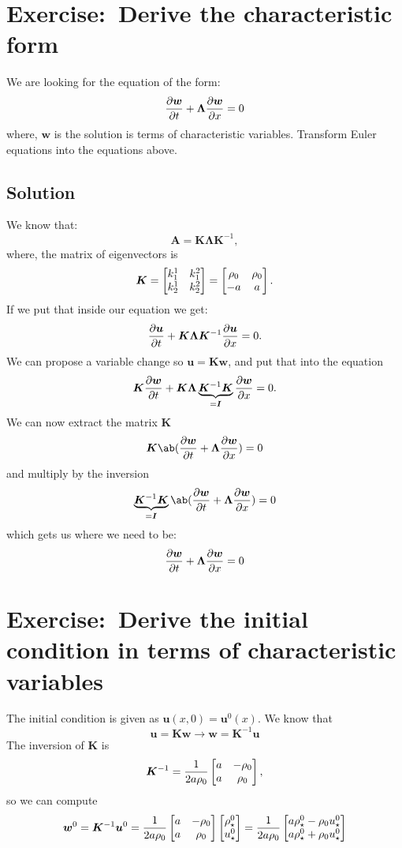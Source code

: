 \documentclass[justified, nobib,a4paper]{tufte-handout}
\newcommand{\Q}[1]{\section{Exercise:~{#1}}}
\newcommand{\Sol}{\subsection{Solution}}
\begin{document}
\Q{Derive the characteristic form}
We are looking for the equation of the form:
\[
	\pdv{\bm{w}}{t} + \bm{\Lambda}\pdv{\bm{w}}{x} = 0
\]
where, $\bm{w}$ is the solution is terms of characteristic variables. Transform Euler equations into the equations above.
\Sol
We know that:
\[
	\bm{A} = \bm{K}\bm{\Lambda}\bm{K}^{-1},
\]
where, the matrix of eigenvectors is
\[
	\bm{K} = \begin{bmatrix}
		k^1_1 & k^2_1 \\
		k^1_2 & k^2_2
	\end{bmatrix} = \begin{bmatrix}
		\rho_0 & \rho_0 \\
		-a  & a
	\end{bmatrix}.
\]
If we put that inside our equation we get:
\[
	\pdv{\bm{u}}{t} + \bm{K}\bm{\Lambda}\bm{K}^{-1}\pdv{\bm{u}}{x} = 0.
\]
We can propose a variable change so $\bm{u} = \bm{K}\bm{w}$, and put that into the
equation
\[
	\bm{K}\pdv{\bm{w}}{t} + \bm{K}\bm{\Lambda}\underbrace{\bm{K}^{-1}\bm{K}}_{=\bm{I}}\pdv{\bm{w}}{x} = 0.
\]
We can now extract the matrix $\bm{K}$
\[
	\bm{K}\ab(\pdv{\bm{w}}{t} + \bm{\Lambda}\pdv{\bm{w}}{x}) = 0
\]
and multiply by the inversion
\[
	\underbrace{\bm{K}^{-1}\bm{K}}_{=\bm{I}}\ab(\pdv{\bm{w}}{t} + \bm{\Lambda}\pdv{\bm{w}}{x}) = 0
\]
which gets us where we need to be:
\[
	\pdv{\bm{w}}{t} + \bm{\Lambda}\pdv{\bm{w}}{x} = 0
\]


\Q{Derive the initial condition in terms of characteristic variables}
The initial condition is given as $\bm{u}(x,0) = \bm{u}^0(x)$. We know that
\[
	\bm{u} = \bm{K}\bm{w} \rightarrow \bm{w} = \bm{K}^{-1}\bm{u}
\]
The inversion of $\bm{K}$ is
\[
	\bm{K}^{-1} = \frac{1}{2a\rho_0} \begin{bmatrix}
		a & -\rho_0 \\
		a & \rho_0
	\end{bmatrix},
\]
so we can compute
\[
	\bm{w}^0 = \bm{K}^{-1}\bm{u}^0 = \frac{1}{2a\rho_0} \begin{bmatrix}
		a & -\rho_0 \\
		a & \rho_0
	\end{bmatrix}
	\begin{bmatrix}
		\rho_\star^0 \\
		u_\star^0
	\end{bmatrix} =
	\frac{1}{2a\rho_0}
	\begin{bmatrix}
		a \rho_\star^0 -\rho_0 u_\star^0 \\
		a \rho_\star^0 + \rho_0u_\star^0
	\end{bmatrix}
\]
\end{document}
